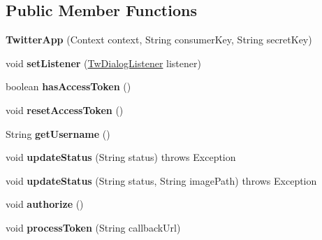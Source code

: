 \subsection*{Public Member Functions}
\begin{DoxyCompactItemize}
\item 
\mbox{\label{classorg_1_1cocos2dx_1_1plugin_1_1TwitterApp_affbfe5bb1a7b52d4dbe6c937b5f306ad}} 
{\bfseries Twitter\+App} (Context context, String consumer\+Key, String secret\+Key)
\item 
\mbox{\label{classorg_1_1cocos2dx_1_1plugin_1_1TwitterApp_abde958367c28c04f50055adc6cd5ae6d}} 
void {\bfseries set\+Listener} (\hyperlink{interfaceorg_1_1cocos2dx_1_1plugin_1_1TwitterApp_1_1TwDialogListener}{Tw\+Dialog\+Listener} listener)
\item 
\mbox{\label{classorg_1_1cocos2dx_1_1plugin_1_1TwitterApp_a6f5236eaec851123915a0cf8adb72e6f}} 
boolean {\bfseries has\+Access\+Token} ()
\item 
\mbox{\label{classorg_1_1cocos2dx_1_1plugin_1_1TwitterApp_a018af3bc7dff1518bff9aa3a78167b34}} 
void {\bfseries reset\+Access\+Token} ()
\item 
\mbox{\label{classorg_1_1cocos2dx_1_1plugin_1_1TwitterApp_a7d7e6608a273b45bba0ce5af3e7ab618}} 
String {\bfseries get\+Username} ()
\item 
\mbox{\label{classorg_1_1cocos2dx_1_1plugin_1_1TwitterApp_a3faa3e481c1a3ddd64797a637a4c39aa}} 
void {\bfseries update\+Status} (String status)  throws Exception 
\item 
\mbox{\label{classorg_1_1cocos2dx_1_1plugin_1_1TwitterApp_a0a71fd8a1ad0d22fb4f599457d171229}} 
void {\bfseries update\+Status} (String status, String image\+Path)  throws Exception 
\item 
\mbox{\label{classorg_1_1cocos2dx_1_1plugin_1_1TwitterApp_a3419cb64ed8e29e569b4d6a6fcd44090}} 
void {\bfseries authorize} ()
\item 
\mbox{\label{classorg_1_1cocos2dx_1_1plugin_1_1TwitterApp_a9caec60c2d8cf5363b2f542bc2c4fcd1}} 
void {\bfseries process\+Token} (String callback\+Url)
\end{DoxyCompactItemize}
